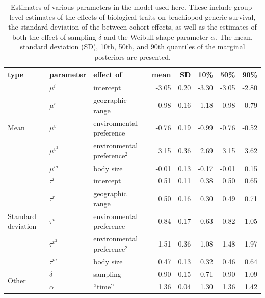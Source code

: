 \documentclass[11pt]{article}
\begin{document}
\begin{table}
  \centering
  \caption{Estimates of various parameters in the model used here. These include group-level estimates of the effects of biological traits on brachiopod generic survival, the standard deviation of the between-cohort effects, as well as the estimates of both the effect of sampling \(\delta\) and the Weibull shape parameter \(\alpha\). The mean, standard deviation (SD), 10th, 50th, and 90th quantiles of the marginal posteriors are presented.}
  \begin{tabular}{ l | l p{2.5cm} r r r r r }
    \hline
    type & parameter & effect of & mean & SD & 10\% & 50\% & 90\% \\ 
    \hline
    \multirow{5}{*}{Mean} & \(\mu^{i}\) & intercept & -3.05 & 0.20 & -3.30 & -3.05 & -2.80 \\
    & \(\mu^{r}\) & geographic range & -0.98 & 0.16 & -1.18 & -0.98 & -0.79 \\
    & \(\mu^{v}\) & environmental preference & -0.76 & 0.19 & -0.99 & -0.76 & -0.52 \\
    & \(\mu^{v^{2}}\) & environmental preference\(^{2}\) & 3.15 & 0.36 & 2.69 & 3.15 & 3.62 \\
    & \(\mu^{m}\) & body size &  -0.01 & 0.13 & -0.17 & -0.01 & 0.15 \\
    \hline
    \multirow{5}{*}{Standard deviation} & \(\tau^{i}\) & intercept & 0.51 & 0.11 & 0.38 & 0.50 & 0.65 \\
    & \(\tau^{r}\) & geographic range & 0.50 & 0.16 & 0.30 & 0.49 & 0.71 \\ 
    & \(\tau^{v}\) & environmental preference & 0.84 & 0.17 & 0.63 & 0.82 & 1.05 \\
    & \(\tau^{v^{2}}\) & environmental preference\(^{2}\) & 1.51 & 0.36 & 1.08 & 1.48 & 1.97 \\
    & \(\tau^{m}\) & body size & 0.47 & 0.13 & 0.32 & 0.46 & 0.64 \\ 
    \hline
    \multirow{2}{*}{Other} & \(\delta\) & sampling & 0.90 & 0.15 & 0.71 & 0.90 & 1.09 \\ 
    & \(\alpha\) & ``time'' & 1.36 & 0.04 & 1.30 & 1.36 & 1.42 \\ 
    \hline
  \end{tabular}
  \label{tab:param}
\end{table}


\clearpage
\end{document}
